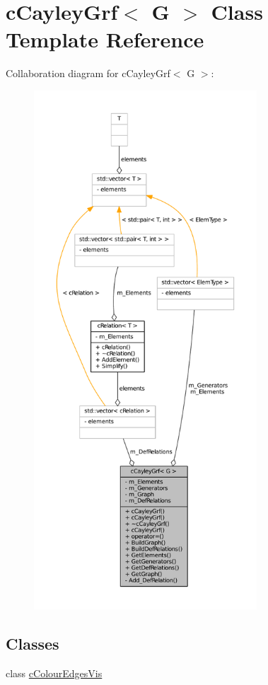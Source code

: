 \hypertarget{classcCayleyGrf}{
\section{c\-Cayley\-Grf$<$ \-G $>$ \-Class \-Template \-Reference}
\label{classcCayleyGrf}
}


\-Collaboration diagram for c\-Cayley\-Grf$<$ \-G $>$\-:
\nopagebreak
\begin{figure}[H]
\begin{center}
\leavevmode
\includegraphics[height=550pt]{classcCayleyGrf__coll__graph}
\end{center}
\end{figure}
\subsection*{\-Classes}
\begin{DoxyCompactItemize}
\item 
class \hyperlink{classcCayleyGrf_1_1cColourEdgesVis}{c\-Colour\-Edges\-Vis}
\end{DoxyCompactItemize}
